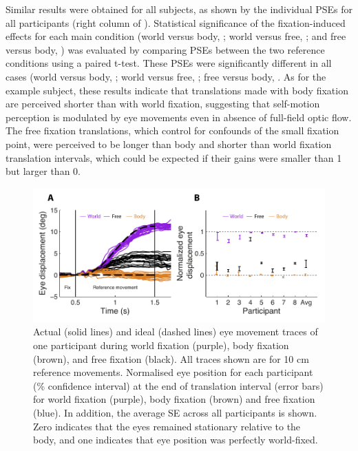 Similar results were obtained for all subjects, as shown by the individual PSEs for all participants (right column of ). Statistical significance of the fixation-induced effects for each main condition (world versus body, ; world versus free, ; and free versus body, ) was evaluated by comparing PSEs between the two reference conditions using a paired t-test. These PSEs were significantly different in all cases (world versus body, ; world versus free, ; free versus body, . As for the example subject, these results indicate that translations made with body fixation are perceived shorter than with world fixation, suggesting that self-motion perception is modulated by eye movements even in absence of full-field optic flow. The free fixation translations, which control for confounds of the small fixation point, were perceived to be longer than body and shorter than world fixation translation intervals, which could be expected if their gains were smaller than 1 but larger than 0.

\begin{figure}
    \includegraphics[width=1.0\textwidth]{src/paper3/figure3.pdf}

    \caption{ Actual (solid lines) and ideal (dashed lines) eye movement traces of one participant during world fixation (purple), body fixation (brown), and free fixation (black). All traces shown are for 10 \si{\centi\metre} reference movements.  Normalised eye position for each participant (\% confidence interval) at the end of translation interval (error bars) for world fixation (purple), body fixation (brown) and free fixation (blue). In addition, the average {\textpm}SE across all participants is shown. Zero indicates that the eyes remained stationary relative to the body, and one indicates that eye position was perfectly world-fixed.}
    \label{p3:fig3}
\end{figure}

